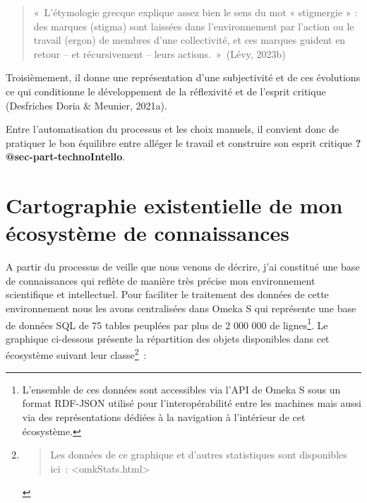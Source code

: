 \documentclass[
  a4paper,
  DIV=11,
  numbers=noendperiod]{scrreprt}
\begin{document}
\begin{quote}
«~L'étymologie grecque explique assez bien le sens du mot « stigmergie »
: des marques (stigma) sont laissées dans l'environnement par l'action
ou le travail (ergon) de membres d'une collectivité, et ces marques
guident en retour -- et récursivement -- leurs actions.~»~(Lévy, 2023b)
\end{quote}

Troisièmement, il donne une représentation d'une subjectivité et de ces
évolutions ce qui conditionne le développement de la réflexivité et de
l'esprit critique (Desfriches Doria \& Meunier, 2021a).

Entre l'automatisation du processus et les choix manuels, il convient
donc de pratiquer le bon équilibre entre alléger le travail et
construire son esprit critique \textbf{?@sec-part-technoIntello}.

\section{Cartographie existentielle de mon écosystème de
connaissances}\label{cartographie-existentielle-de-mon-uxe9cosystuxe8me-de-connaissances}

A partir du processus de veille que nous venons de décrire, j'ai
constitué une base de connaissances qui reflète de manière très précise
mon environnement scientifique et intellectuel. Pour faciliter le
traitement des données de cette environnement nous les avons
centralisées dans Omeka S qui représente une base de données SQL de 75
tables peuplées par plus de 2 000 000 de lignes\footnote{L'ensemble de
  ces données sont accessibles via l'API de Omeka S sous un format
  RDF-JSON utilisé pour l'interopérabilité entre les machines mais aussi
  via des représentations dédiées à la navigation à l'intérieur de cet
  écosystème.}. Le graphique ci-dessous présente la répartition des
objets disponibles dans cet écosystème suivant leur classe\footnote{\begin{quote}
  Les données de ce graphique et d'autres statistiques sont disponibles
  ici~: \textless omkStats.html\textgreater{}
  \end{quote}}~:
\end{document}
